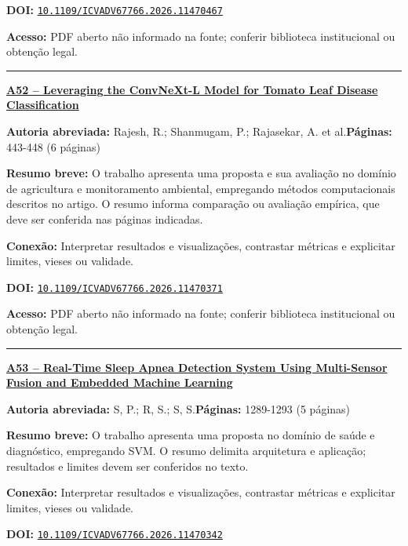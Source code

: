 \documentclass[10pt,a4paper]{article}
\begin{document}
\textbf{DOI:} \href{https://doi.org/10.1109/ICVADV67766.2026.11470467}{\nolinkurl{10.1109/ICVADV67766.2026.11470467}}\par
\textbf{Acesso:} PDF aberto não informado na fonte; conferir biblioteca institucional ou obtenção legal.\par
\noindent\rule{\textwidth}{0.35pt}
\par\medskip\noindent
{\large\bfseries\href{https://doi.org/10.1109/ICVADV67766.2026.11470371}{A52 -- Leveraging the ConvNeXt-L Model for Tomato Leaf Disease Classification}}\par\smallskip
\textbf{Autoria abreviada:} Rajesh, R.; Shanmugam, P.; Rajasekar, A. et al.\quad \textbf{Páginas:} 443-448 (6 páginas)\par
\textbf{Resumo breve:} O trabalho apresenta uma proposta e sua avaliação no domínio de agricultura e monitoramento ambiental, empregando métodos computacionais descritos no artigo. O resumo informa comparação ou avaliação empírica, que deve ser conferida nas páginas indicadas.\par
\textbf{Conexão:} Interpretar resultados e visualizações, contrastar métricas e explicitar limites, vieses ou validade.\par
\textbf{DOI:} \href{https://doi.org/10.1109/ICVADV67766.2026.11470371}{\nolinkurl{10.1109/ICVADV67766.2026.11470371}}\par
\textbf{Acesso:} PDF aberto não informado na fonte; conferir biblioteca institucional ou obtenção legal.\par
\noindent\rule{\textwidth}{0.35pt}
\par\medskip\noindent
{\large\bfseries\href{https://doi.org/10.1109/ICVADV67766.2026.11470342}{A53 -- Real-Time Sleep Apnea Detection System Using Multi-Sensor Fusion and Embedded Machine Learning}}\par\smallskip
\textbf{Autoria abreviada:} S, P.; R, S.; S, S.\quad \textbf{Páginas:} 1289-1293 (5 páginas)\par
\textbf{Resumo breve:} O trabalho apresenta uma proposta no domínio de saúde e diagnóstico, empregando SVM. O resumo delimita arquitetura e aplicação; resultados e limites devem ser conferidos no texto.\par
\textbf{Conexão:} Interpretar resultados e visualizações, contrastar métricas e explicitar limites, vieses ou validade.\par
\textbf{DOI:} \href{https://doi.org/10.1109/ICVADV67766.2026.11470342}{\nolinkurl{10.1109/ICVADV67766.2026.11470342}}\par
\end{document}
